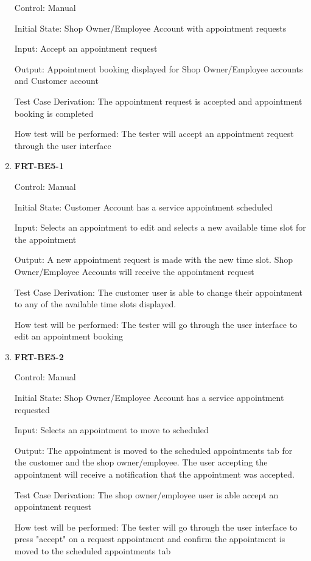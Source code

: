 \documentclass[12pt, titlepage]{article}
\begin{document}
\begin{enumerate}
	      Control: Manual

	      Initial State: Shop Owner/Employee Account with appointment requests

	      Input: Accept an appointment request

	      Output: Appointment booking displayed for Shop Owner/Employee accounts and Customer account

	      Test Case Derivation: The appointment request is accepted and appointment booking is completed

	      How test will be performed: The tester will accept an appointment request through the user
	      interface

	\item \textbf{FRT-BE5-1}

	      Control: Manual

	      Initial State: Customer Account has a service appointment scheduled

	      Input: Selects an appointment to edit and selects a new available time slot for the appointment

	      Output: A new appointment request is made with the new time slot. Shop Owner/Employee Accounts will
	      receive the appointment request

	      Test Case Derivation: The customer user is able to change their appointment to any of the available
	      time slots displayed.

	      How test will be performed: The tester will go through the user interface to edit an appointment
	      booking

	\item \textbf{FRT-BE5-2}

	      Control: Manual

	      Initial State: Shop Owner/Employee Account has a service appointment requested

	      Input: Selects an appointment to move to scheduled

	      Output: The appointment is moved to the scheduled appointments tab for the customer and the shop
	      owner/employee. The user accepting the appointment will receive a notification that the appointment
	      was accepted.

	      Test Case Derivation: The shop owner/employee user is able accept an appointment request

	      How test will be performed: The tester will go through the user interface to press "accept" on a
	      request appointment and confirm the appointment is moved to the scheduled appointments tab


\end{enumerate}
\end{document}
